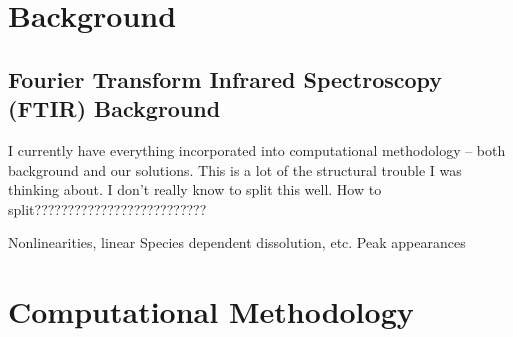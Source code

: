 \documentclass[draft]{agujournal2019}
\begin{document}



\section{Background}
\subsection{Fourier Transform Infrared Spectroscopy (FTIR) Background}
I currently have everything incorporated into computational methodology -- both background and our solutions. This is a lot of the structural trouble I was thinking about. I don't really know to split this well. How to split??????????????????????????

Nonlinearities, linear 
Species dependent dissolution, etc. 
Peak appearances 



\section{Computational Methodology} %
\end{document}
